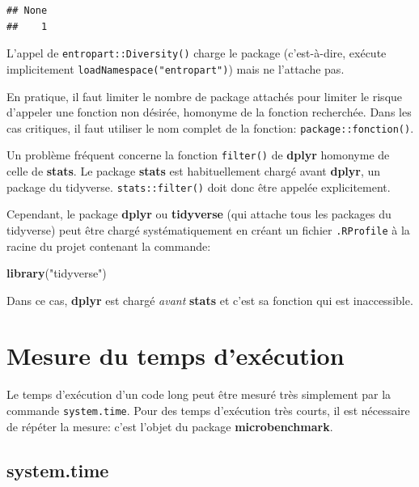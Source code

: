 \documentclass[
  12pt,
  french,
  a4paper,
  extrafontsizes,onecolumn,openright
  ]{memoir}
\newenvironment{Shaded}{\begin{snugshade}}{\end{snugshade}}
\newcommand{\FunctionTok}[1]{\textcolor[rgb]{0.13,0.29,0.53}{\textbf{#1}}}
\newcommand{\NormalTok}[1]{#1}
\newcommand{\StringTok}[1]{\textcolor[rgb]{0.31,0.60,0.02}{#1}}
\begin{document}
\begin{verbatim}
## None 
##    1
\end{verbatim}

\normalsize

L'appel de \texttt{entropart::Diversity()} charge le package (c'est-à-dire, exécute implicitement \texttt{loadNamespace("entropart")}) mais ne l'attache pas.

En pratique, il faut limiter le nombre de package attachés pour limiter le risque d'appeler une fonction non désirée, homonyme de la fonction recherchée.
Dans les cas critiques, il faut utiliser le nom complet de la fonction: \texttt{package::fonction()}.

Un problème fréquent concerne la fonction \texttt{filter()} de \textbf{dplyr} homonyme de celle de \textbf{stats}.
Le package \textbf{stats} est habituellement chargé avant \textbf{dplyr}, un package du tidyverse.
\texttt{stats::filter()} doit donc être appelée explicitement.

Cependant, le package \textbf{dplyr} ou \textbf{tidyverse} (qui attache tous les packages du tidyverse) peut être chargé systématiquement en créant un fichier \texttt{.RProfile} à la racine du projet contenant la commande:

\scriptsize

\begin{Shaded}
\begin{Highlighting}[]
\FunctionTok{library}\NormalTok{(}\StringTok{"tidyverse"}\NormalTok{)}
\end{Highlighting}
\end{Shaded}

\normalsize

Dans ce cas, \textbf{dplyr} est chargé \emph{avant} \textbf{stats} et c'est sa fonction qui est inaccessible.

\section{Mesure du temps d'exécution}\label{mesure-du-temps-dexuxe9cution}

Le temps d'exécution d'un code long peut être mesuré très simplement par la commande \texttt{system.time}.
Pour des temps d'exécution très courts, il est nécessaire de répéter la mesure: c'est l'objet du package \textbf{microbenchmark}.

\subsection{system.time}\label{system.time}
\end{document}
